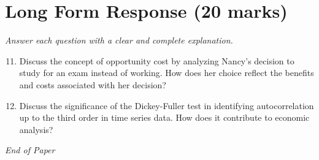 \documentclass[12pt]{article}
\begin{document}
\section*{Long Form Response (20 marks)}
\textit{Answer each question with a clear and complete explanation.}
\begin{enumerate}[label=\arabic*.]
\setcounter{enumi}{10}
\item Discuss the concept of opportunity cost by analyzing Nancy's decision to study for an exam instead of working. How does her choice reflect the benefits and costs associated with her decision?
\item Discuss the significance of the Dickey-Fuller test in identifying autocorrelation up to the third order in time series data. How does it contribute to economic analysis?
\end{enumerate}

\vfill
\noindent\textit{End of Paper}
\end{document}
